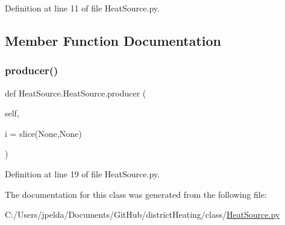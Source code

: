 Definition at line 11 of file Heat\+Source.\+py.



\subsection{Member Function Documentation}
\mbox{\label{class_heat_source_1_1_heat_source_a2c86ea2252b3a4f0eec9428fc61e14ab}} 
\subsubsection{\texorpdfstring{producer()}{producer()}}
{\footnotesize\ttfamily def Heat\+Source.\+Heat\+Source.\+producer (\begin{DoxyParamCaption}\item[{}]{self,  }\item[{}]{i = {\ttfamily slice(None,None)} }\end{DoxyParamCaption})}



Definition at line 19 of file Heat\+Source.\+py.



The documentation for this class was generated from the following file\+:\begin{DoxyCompactItemize}
\item 
C\+:/\+Users/jpelda/\+Documents/\+Git\+Hub/district\+Heating/class/\hyperlink{_heat_source_8py}{Heat\+Source.\+py}\end{DoxyCompactItemize}
